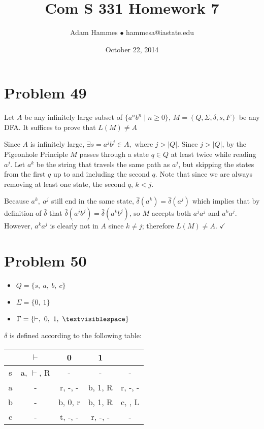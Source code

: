 \documentclass[11pt]{article}
\begin{document}
\title{Com S 331 Homework 7}
\author{Adam Hammes $\bullet$ hammesa@iastate.edu}
\date{October 22, 2014}
\maketitle

\section*{Problem 49}

Let $A$ be any infinitely large subset of $\{a^nb^n \mid n \geq 0\}$, $M = (Q, \Sigma, \delta, s, F)$ be any DFA. It suffices to prove that $L(M) \neq A$

 Since $A$ is infinitely large, $\exists s=a^jb^j \in A,$ where $j > |Q|$. Since $j > |Q|$, by the Pigeonhole Principle $M$ passes through a state $q \in Q$ at least twice while reading $a^j$. Let $a^k$ be the string that travels the same path as $a^j$, but skipping the states from the first $q$ up to and including the second $q$. Note that since we are always removing at least one state, the second $q$, $k < j$.

Because $a^k,\ a^j$ still end in the same state, $\hat{\delta}(a^k) = \hat{\delta}(a^j)$ which implies that by definition of $\hat{\delta}$ that $\hat{\delta}(a^jb^j) = \hat{\delta}(a^kb^j)$, so $M$ accepts both $a^ja^j$ and $a^ka^j$. However, $a^ka^j$ is clearly not in $A$ since $k \neq j$; therefore $L(M) \neq A$. $\checkmark$




\section*{Problem 50}

\begin{itemize}
	\item $Q = \{ s,\ a,\ b,\ c \}$
	\item $\Sigma = \{0,\ 1\}$
	\item $\Gamma = \{ \vdash,\ 0,\ 1,\ \textvisiblespace\}$
\end{itemize}

$\delta$ is defined according to the following table:

\begin{tabular}{ c | c | c | c | c }
			& $\vdash$ 			& 0 					& 1 				& \textvisiblespace \\
			\hline
	s		& a, $\vdash$, R 	& -					& -				& - \\
	a		& - 						& r, -, -				& b, 1, R		&  r, -, -\\
	b		& -						& b, 0, r			& b, 1, R		& c, \textvisiblespace , L \\
	c		& -						& t, -, -				& r, -, -			& -
\end{tabular}
\end{document}
